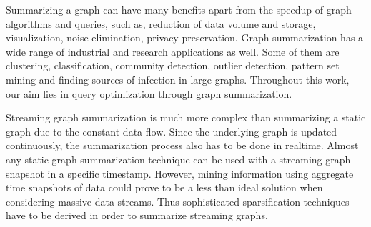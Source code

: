 Summarizing a graph can have many benefits\cite{liu_graph_2018} apart from the speedup of graph algorithms and queries, such as, reduction of data volume and storage\cite{seo_effective_2018}, visualization\cite{dunne_motif_2013, jin_eco_nodate}, noise elimination\cite{zhang_discovery-driven_2010}, privacy preservation\cite{shoaran_zero-knowledge_2013}. Graph summarization has a wide range of industrial and research applications as well. Some of them are clustering\cite{cilibrasi_clustering_2005}, classification\cite{hutchison_compression_2006}, community detection\cite{chakrabarti_fully_nodate}, outlier detection\cite{smets_odd_2011, akoglu_opavion_2012}, pattern set mining\cite{mampaey_tell_2011} and finding sources of infection in large graphs\cite{prakash_spotting_2012}. Throughout this work, our aim lies in query optimization through graph summarization.

Streaming graph summarization is much more complex than summarizing a static graph due to the constant data flow. Since the underlying graph is updated continuously, the summarization process also has to be done in realtime. Almost any static graph summarization technique can be used with a streaming graph snapshot in a specific timestamp. However, mining information using aggregate time snapshots of data could prove to be a less than ideal solution when considering massive data streams. Thus sophisticated sparsification techniques have to be derived in order to summarize streaming graphs. 